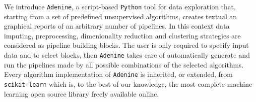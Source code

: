 \documentclass[twoside,11pt]{article}
\makeatletter
\newcommand{\ade}{\texttt{Adenine}\@\xspace}
\newcommand{\py}{\texttt{Python}\@\xspace}
\makeatother
\begin{document}
We introduce \ade, a script-based \py tool for data exploration that, starting from a set of predefined unsupervised algorithms, creates textual an graphical reports of an arbitrary number of pipelines. In this context data imputing, preprocessing, dimenionality reduction and clustering strategies are considered as pipeline building blocks. The user is only required to specify input data and to select blocks, then \ade takes care of automatically generate and run the pipelines made by all possible combinations of the selected algorithms. Every algorithm implementation of \ade is inherited, or extended, from \texttt{scikit-learn} \citep{scikit-learn} which is, to the best of our knowledge, the most complete machine learning open source library freely available online.

\end{document}
